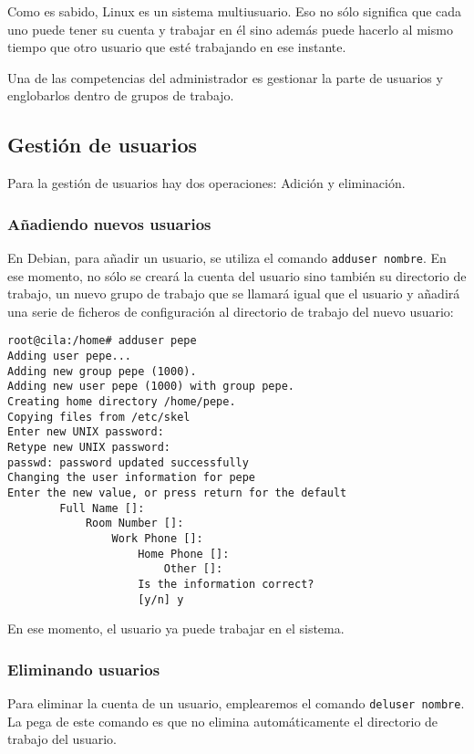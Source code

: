 Como  es  sabido,  Linux  es  un sistema  multiusuario.  Eso  no  sólo
significa que  cada uno puede  tener su cuenta  y trabajar en  él sino
además  puede  hacerlo al  mismo  tiempo  que  otro usuario  que  esté
trabajando en ese instante.

Una de  las competencias  del administrador es  gestionar la  parte de
usuarios y englobarlos dentro de grupos de trabajo.

\subsection{Gestión de usuarios}
Para  la   gestión  de  usuarios   hay  dos  operaciones:   Adición  y
eliminación.

\subsubsection{Añadiendo nuevos usuarios}

En Debian, para añadir un usuario, se utiliza el comando {\tt adduser
nombre}. En ese momento, no sólo se creará la cuenta del usuario sino
también su directorio de trabajo, un nuevo grupo de trabajo que se
llamará igual que el usuario y añadirá una serie de ficheros de
configuración al directorio de trabajo del nuevo usuario:

\begin{verbatim}
root@cila:/home# adduser pepe
Adding user pepe...
Adding new group pepe (1000).
Adding new user pepe (1000) with group pepe.
Creating home directory /home/pepe.
Copying files from /etc/skel
Enter new UNIX password:
Retype new UNIX password:
passwd: password updated successfully
Changing the user information for pepe
Enter the new value, or press return for the default
        Full Name []:
	        Room Number []:
		        Work Phone []:
			        Home Phone []:
				        Other []:
					Is the information correct?
					[y/n] y
\end{verbatim}

En ese momento, el usuario ya puede trabajar en el sistema.

\subsubsection{Eliminando usuarios}

Para  eliminar  la  cuenta  de  un  usuario,  emplearemos  el  comando
{\tt  deluser nombre}.  La  pega de  este comando  es  que no  elimina
automáticamente el directorio de trabajo del usuario.

